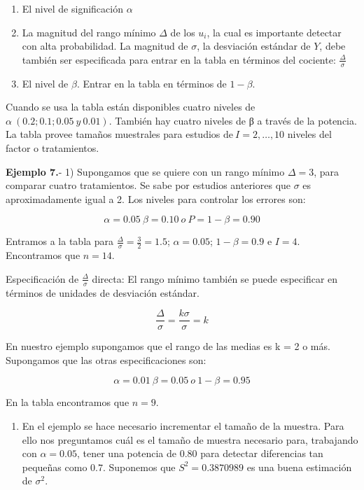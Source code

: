 \documentclass[]{book}
\providecommand{\tightlist}{%
  \setlength{\itemsep}{0pt}\setlength{\parskip}{0pt}}
\theoremstyle{definition}
\theoremstyle{definition}
\theoremstyle{definition}
\theoremstyle{remark}
\begin{document}
\begin{enumerate}
\def\labelenumi{\arabic{enumi}.}
\item
  El nivel de significación \(\alpha\)
\item
  La magnitud del rango mínimo \(\Delta\) de los \(u_{i}\), la cual es
  importante detectar con alta probabilidad. La magnitud de \(\sigma\),
  la desviación estándar de \(Y\), debe también ser especificada para
  entrar en la tabla en términos del cociente: \(\frac{\Delta}{\sigma}\)
\item
  El nivel de \(\beta\). Entrar en la tabla en términos de
  \(1 - \beta\).
\end{enumerate}

Cuando se usa la tabla están disponibles cuatro niveles de \(\alpha\
(0.2;0.1;0.05\ y\ 0.01)\). También hay cuatro niveles de β a través de
la potencia. La tabla provee tamaños muestrales para estudios
\(\text{de}\ I = 2,\ldots,10\) niveles del factor o tratamientos.

\textbf{Ejemplo 7.}- 1) Supongamos que se quiere con un rango mínimo
\(\Delta = 3\), para comparar cuatro tratamientos. Se sabe por estudios
anteriores que \(\sigma\) es aproximadamente igual a 2. Los niveles para
controlar los errores son:

\[
\alpha = 0.05\ \beta = 0.10\ o\ P = 1 - \beta = 0.90
\]

Entramos a la tabla para \(\frac{\Delta}{\sigma} = \frac{3}{2} = 1.5\);
\(\alpha = 0.05\); \(1 - \beta = 0.9\) e \(I = 4\). Encontramos que
\(n = 14\).

Especificación de \(\frac{\Delta}{\sigma}\) directa: El rango mínimo
también se puede especificar en términos de unidades de desviación
estándar.

\[
\frac{\Delta}{\sigma} = \frac{k\sigma}{\sigma} = k
\]

En nuestro ejemplo supongamos que el rango de las medias es k = 2 o más.
Supongamos que las otras especificaciones son:

\[
\alpha = 0.01\ \beta = 0.05\ o\ 1 - \beta = 0.95
\]

En la tabla encontramos que \(n = 9\).

\begin{enumerate}
\def\labelenumi{\arabic{enumi})}
\setcounter{enumi}{1}
\tightlist
\item
  En el ejemplo se hace necesario incrementar el tamaño de la muestra.
  Para ello nos preguntamos cuál es el tamaño de muestra necesario para,
  trabajando con \(\alpha = 0.05\), tener una potencia de \(0.80\) para
  detectar diferencias tan pequeñas como \(0.7\). Suponemos que
  \(S^{2} = 0.3870989\) es una buena estimación de \(\sigma^{2}\).
\end{enumerate}
\end{document}
